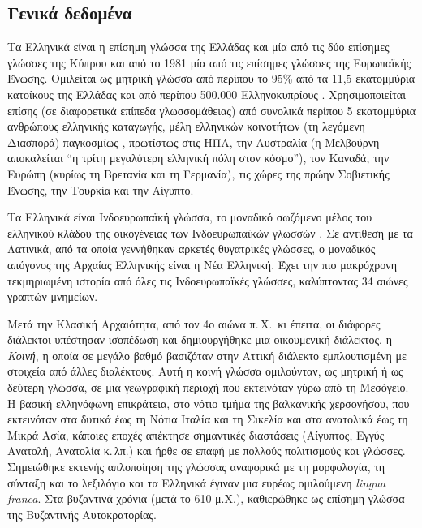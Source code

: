 \begin{multicols}{2}
\subsection{Γενικά δεδομένα}

Τα Ελληνικά είναι η επίσημη γλώσσα της Ελλάδας και μία από τις δύο επίσημες γλώσσες της Κύπρου και από το 1981 μία από τις επίσημες γλώσσες της Ευρωπαϊκής Ένωσης. Ομιλείται ως μητρική γλώσσα από περίπου το 95\% από τα 11,5 εκατομμύρια κατοίκους της Ελλάδας και από περίπου 500.000 Ελληνοκυπρίους \cite{Stat1}. Χρησιμοποιείται επίσης (σε διαφορετικά επίπεδα γλωσσομάθειας)  από συνολικά περίπου 5 εκατομμύρια ανθρώπους ελληνικής καταγωγής, μέλη ελληνικών κοινοτήτων (τη λεγόμενη Διασπορά) παγκοσμίως \cite{Dias1}, πρωτίστως στις ΗΠΑ, την Αυστραλία (η Μελβούρνη αποκαλείται “η τρίτη μεγαλύτερη ελληνική πόλη στον κόσμο”), τον Καναδά, την Ευρώπη (κυρίως τη Βρετανία και τη Γερμανία), τις χώρες της πρώην Σοβιετικής Ένωσης, την Τουρκία και την Αίγυπτο.

Τα Ελληνικά είναι Ινδοευρωπαϊκή γλώσσα, το μοναδικό σωζόμενο μέλος του ελληνικού κλάδου της οικογένειας των Ινδοευρωπαϊκών γλωσσών \cite{Trud1}. Σε αντίθεση με τα Λατινικά, από τα οποία γεννήθηκαν αρκετές θυγατρικές γλώσσες, ο μοναδικός απόγονος της  Αρχαίας Ελληνικής είναι η Νέα Ελληνική. Έχει την πιο μακρόχρονη τεκμηριωμένη ιστορία από όλες τις Ινδοευρωπαϊκές γλώσσες, καλύπτοντας 34 αιώνες γραπτών μνημείων.

Μετά την Κλασική Αρχαιότητα, από τον 4ο αιώνα π.\,Χ.~κι έπειτα, οι διάφορες διάλεκτοι υπέστησαν ισοπέδωση και δημιουργήθηκε μια οικουμενική διάλεκτος, η \textit{Κοινή}, η οποία σε μεγάλο βαθμό βασιζόταν στην Αττική διάλεκτο εμπλουτισμένη με στοιχεία από άλλες διαλέκτους. Αυτή η κοινή γλώσσα ομιλούνταν, ως μητρική ή ως δεύτερη γλώσσα, σε μια γεωγραφική περιοχή  που εκτεινόταν γύρω από τη Μεσόγειο. Η βασική ελληνόφωνη επικράτεια, στο  νότιο τμήμα της βαλκανικής χερσονήσου, που εκτεινόταν στα δυτικά έως τη Νότια Ιταλία και τη Σικελία και στα ανατολικά έως τη Μικρά Ασία, κάποιες εποχές απέκτησε σημαντικές διαστάσεις (Αίγυπτος, Εγγύς Ανατολή, Ανατολία κ.\,λπ.) και ήρθε σε επαφή με πολλούς πολιτισμούς και γλώσσες. Σημειώθηκε εκτενής απλοποίηση της γλώσσας αναφορικά με τη μορφολογία, τη σύνταξη και το λεξιλόγιο και τα Ελληνικά έγιναν μια ευρέως ομιλούμενη \textit{lingua franca}. Στα βυζαντινά χρόνια (μετά το 610 μ.Χ.), καθιερώθηκε ως επίσημη γλώσσα της Βυζαντινής Αυτοκρατορίας.


\end{multicols}

